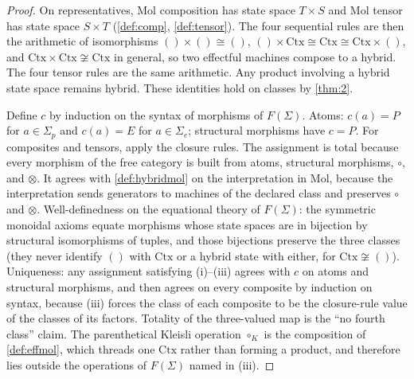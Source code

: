 \begin{proof}
On representatives, Mol composition has state space $T \times S$ and
Mol tensor has state space $S \times T$ (\autoref{def:comp},
\autoref{def:tensor}). The four sequential rules are then the
arithmetic of isomorphisms $() \times () \cong ()$,
$() \times \mathrm{Ctx} \cong \mathrm{Ctx} \cong \mathrm{Ctx} \times
()$, and $\mathrm{Ctx} \times \mathrm{Ctx} \not\cong \mathrm{Ctx}$ in
general, so two effectful machines compose to a hybrid. The four
tensor rules are the same arithmetic. Any product involving a hybrid
state space remains hybrid. These identities hold on classes by
\autoref{thm:2}.

Define $c$ by induction on the syntax of morphisms of $F(\Sigma)$.
Atoms: $c (a) = P$ for $a \in \Sigma_p$ and $c (a) = E$ for
$a \in \Sigma_e$; structural morphisms have $c = P$. For composites
and tensors, apply the closure rules. The assignment is total because
every morphism of the free category is built from atoms, structural
morphisms, $\circ$, and $\otimes$. It agrees with
\autoref{def:hybridmol} on the interpretation in Mol, because the
interpretation sends generators to machines of the declared class and
preserves $\circ$ and $\otimes$. Well-definedness on the equational
theory of $F(\Sigma)$: the symmetric monoidal axioms equate morphisms
whose state spaces are in bijection by structural isomorphisms of
tuples, and those bijections preserve the three classes (they never
identify $()$ with $\mathrm{Ctx}$ or a hybrid state with either, for
$\mathrm{Ctx} \not\cong ()$). Uniqueness: any assignment satisfying
(i)--(iii) agrees with $c$ on atoms and structural morphisms, and then
agrees on every composite by induction on syntax, because (iii) forces
the class of each composite to be the closure-rule value of the
classes of its factors. Totality of the three-valued map is the ``no
fourth class'' claim. The parenthetical Kleisli operation $\circ_K$ is
the composition of \autoref{def:effmol}, which threads one
$\mathrm{Ctx}$ rather than forming a product, and therefore lies outside
the operations of $F(\Sigma)$ named in (iii).
\end{proof}

